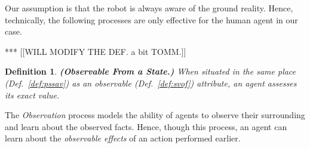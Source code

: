 \documentclass[letterpaper]{article} %
\newtheorem{definition}{Definition}
\begin{document}
Our assumption is that the robot is always aware of the ground reality. 
Hence, technically, the following processes are only effective for the human agent in our case. 

*** [[WILL MODIFY THE DEF. a bit TOMM.]]
\begin{definition} 
\label{def:obs}
    \textbf{(Observable From a State.)} When situated in the same place (Def.~\ref{def:pssav}) as an observable (Def.~\ref{def:svof}) attribute, an agent assesses its exact value.  
\end{definition}



The \textit{Observation} process models the ability of agents to observe their surrounding and 
learn about
the observed facts. Hence, though this process, an agent can learn about the \textit{observable effects} of an action performed earlier. 


\end{document}
